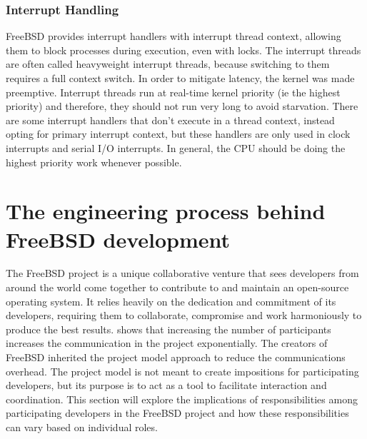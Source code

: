 \documentclass[12pt, dvipsnames, a4paper]{article}
\begin{document}
\subsubsection{Interrupt Handling}

FreeBSD provides interrupt handlers with interrupt thread context, allowing them to block processes during execution, even with locks. The interrupt threads are often called heavyweight interrupt threads, because switching to them requires a full context switch. In order to mitigate latency, the kernel was made preemptive. Interrupt threads run at real-time kernel priority (ie the highest priority) and therefore, they should not run very long to avoid starvation. There are some interrupt handlers that don’t execute in a thread context, instead opting for primary interrupt context, but these handlers are only used in clock interrupts and serial I/O interrupts. In general, the CPU should be doing the highest priority work whenever possible.

\section{ The engineering process behind FreeBSD development }

The FreeBSD project is a unique collaborative venture that sees developers from around the world come together to contribute to and maintain an open-source operating system. It relies heavily on the dedication and commitment of its developers, requiring them to collaborate, compromise and work harmoniously to produce the best results. \cite{brooks} shows that increasing the number of participants increases the communication in the project exponentially. The creators of FreeBSD inherited the project model \cite{dev-model} approach to reduce the communications overhead. The project model is not meant to create impositions for participating developers, but its purpose is to act as a tool to facilitate interaction and coordination. This section will explore the implications of responsibilities among participating developers in the FreeBSD project and how these responsibilities can vary based on individual roles. 
\end{document}
